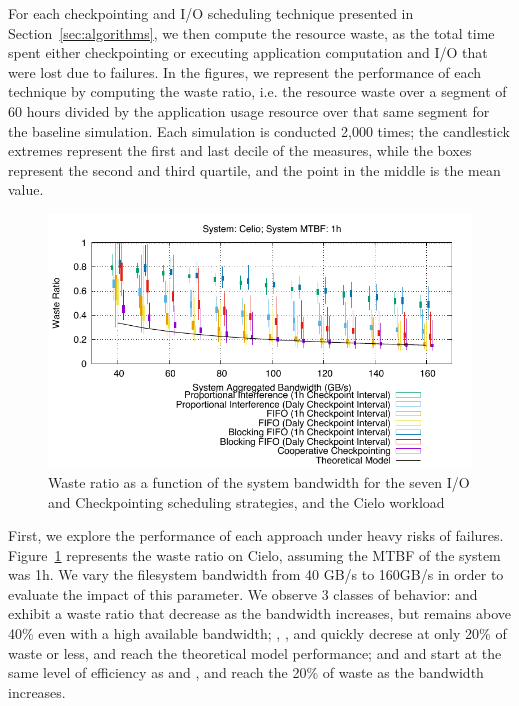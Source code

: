 For each checkpointing and I/O scheduling technique presented in
Section~\ref{sec:algorithms}, we then compute the resource waste, as
the total time spent either checkpointing or executing application computation and I/O that were lost due to failures. In the figures, we represent the
performance of each technique by computing the waste ratio, i.e. the
resource waste over a segment of 60 hours divided by the application
usage resource over that same segment for the baseline
simulation. Each simulation is conducted 2,000 times; the
candlestick extremes represent the first and last decile of the
measures, while the boxes represent the second and third quartile, and
the point in the middle is the mean value.

\begin{figure}
  \begin{center}
    \includegraphics[width=\linewidth]{sim/figures/synthetic-01hMTBF-waste-celio.pdf}
  \end{center}
  \caption{Waste ratio as a function of the system bandwidth for the
    seven I/O and Checkpointing scheduling strategies, and the Cielo
    workload \label{fig:cielo-1hmtbf}}
\end{figure}

First, we explore the performance of each approach under heavy risks
of failures. Figure~\ref{fig:cielo-1hmtbf} represents the waste ratio
on Cielo, assuming the MTBF of the system was 1h. We vary the
filesystem bandwidth from 40 GB/s to 160GB/s in order to evaluate the
impact of this parameter. We observe 3 classes of behavior: \propfixed
and \bfifofixed exhibit a waste ratio that decrease as the bandwidth
increases, but remains above 40\% even with a high available
bandwidth; \fifodaly, \fifofixed, and \cooperative quickly decrese at
only 20\% of waste or less, and reach the theoretical model
performance; and \propdaly and \bfifodaly start at the same level of
efficiency as \propfixed and \bfifofixed, and reach the 20\% of waste
as the bandwidth increases.

